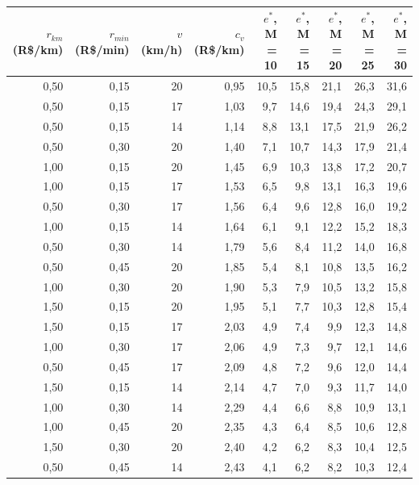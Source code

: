 \begin{tabular}{rrrrrrrrr}
\hline
$r_{km}$ (R\$/km) & $r_{min}$ (R\$/min) & $v$ (km/h) & $c_v$ (R\$/km) & $e^*$, M = 10 & $e^*$, M = 15 & $e^*$, M = 20 & $e^*$, M = 25 & $e^*$, M = 30 \\
\hline
0{,}50 & 0{,}15 & 20 & 0{,}95 & 10{,}5 & 15{,}8 & 21{,}1 & 26{,}3 & 31{,}6 \\
0{,}50 & 0{,}15 & 17 & 1{,}03 & 9{,}7 & 14{,}6 & 19{,}4 & 24{,}3 & 29{,}1 \\
0{,}50 & 0{,}15 & 14 & 1{,}14 & 8{,}8 & 13{,}1 & 17{,}5 & 21{,}9 & 26{,}2 \\
0{,}50 & 0{,}30 & 20 & 1{,}40 & 7{,}1 & 10{,}7 & 14{,}3 & 17{,}9 & 21{,}4 \\
1{,}00 & 0{,}15 & 20 & 1{,}45 & 6{,}9 & 10{,}3 & 13{,}8 & 17{,}2 & 20{,}7 \\
1{,}00 & 0{,}15 & 17 & 1{,}53 & 6{,}5 & 9{,}8 & 13{,}1 & 16{,}3 & 19{,}6 \\
0{,}50 & 0{,}30 & 17 & 1{,}56 & 6{,}4 & 9{,}6 & 12{,}8 & 16{,}0 & 19{,}2 \\
1{,}00 & 0{,}15 & 14 & 1{,}64 & 6{,}1 & 9{,}1 & 12{,}2 & 15{,}2 & 18{,}3 \\
0{,}50 & 0{,}30 & 14 & 1{,}79 & 5{,}6 & 8{,}4 & 11{,}2 & 14{,}0 & 16{,}8 \\
0{,}50 & 0{,}45 & 20 & 1{,}85 & 5{,}4 & 8{,}1 & 10{,}8 & 13{,}5 & 16{,}2 \\
1{,}00 & 0{,}30 & 20 & 1{,}90 & 5{,}3 & 7{,}9 & 10{,}5 & 13{,}2 & 15{,}8 \\
1{,}50 & 0{,}15 & 20 & 1{,}95 & 5{,}1 & 7{,}7 & 10{,}3 & 12{,}8 & 15{,}4 \\
1{,}50 & 0{,}15 & 17 & 2{,}03 & 4{,}9 & 7{,}4 & 9{,}9 & 12{,}3 & 14{,}8 \\
1{,}00 & 0{,}30 & 17 & 2{,}06 & 4{,}9 & 7{,}3 & 9{,}7 & 12{,}1 & 14{,}6 \\
0{,}50 & 0{,}45 & 17 & 2{,}09 & 4{,}8 & 7{,}2 & 9{,}6 & 12{,}0 & 14{,}4 \\
1{,}50 & 0{,}15 & 14 & 2{,}14 & 4{,}7 & 7{,}0 & 9{,}3 & 11{,}7 & 14{,}0 \\
1{,}00 & 0{,}30 & 14 & 2{,}29 & 4{,}4 & 6{,}6 & 8{,}8 & 10{,}9 & 13{,}1 \\
1{,}00 & 0{,}45 & 20 & 2{,}35 & 4{,}3 & 6{,}4 & 8{,}5 & 10{,}6 & 12{,}8 \\
1{,}50 & 0{,}30 & 20 & 2{,}40 & 4{,}2 & 6{,}2 & 8{,}3 & 10{,}4 & 12{,}5 \\
0{,}50 & 0{,}45 & 14 & 2{,}43 & 4{,}1 & 6{,}2 & 8{,}2 & 10{,}3 & 12{,}4 \\

\end{tabular}
